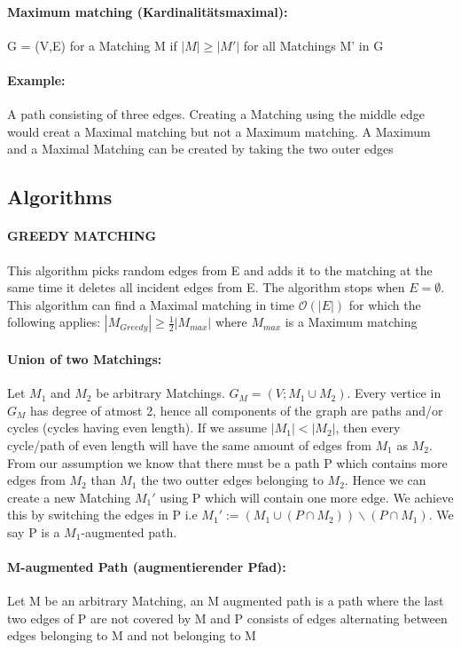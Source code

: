\documentclass[8pt]{extreport}
\begin{document}
\paragraph{Maximum matching (Kardinalitätsmaximal):} G = (V,E) for a Matching M if $|M|\geq |M'|$ for all Matchings M' in G
\paragraph{Example:} A path consisting of three edges. Creating a Matching using the middle edge would creat a Maximal matching but not a Maximum matching. A Maximum and a Maximal Matching can be created by taking the two outer edges
\subsection{Algorithms}
\paragraph{GREEDY MATCHING} This algorithm picks random edges from E and adds it to the matching at the same time it deletes all incident edges from E. The algorithm stops when $E=\emptyset$. This algorithm can find a Maximal matching in time $\mathcal{O}(|E|)$ for which the following applies: $|M_{Greedy}| \geq \frac{1}{2} |M_{max}|$ where $M_{max}$ is a Maximum matching
\paragraph{Union of two Matchings:} Let $M_{1}$ and $M_{2}$ be arbitrary Matchings. $G_{M} = (V;M_{1} \cup M_{2})$. Every vertice in $G_{M}$ has degree of atmost 2, hence all components of the graph are paths and/or cycles (cycles having even length). If we assume $|M_{1}| < |M_{2}|$, then every cycle/path of even length will have the same amount of edges from $M_{1}$ as $M_{2}$. From our assumption we know that there must be a path P which contains more edges from $M_{2}$ than $M_{1}$ the two outter edges belonging to $M_{2}$. Hence we can create a new Matching $M_{1}'$ using P which will contain one more edge. We achieve this by switching the edges in P i.e $M_{1}':= (M_{1} \cup (P \cap M_{2})) \backslash (P \cap M_{1})$. We say P is a $M_{1}$-augmented path.
\paragraph{M-augmented Path (augmentierender Pfad):} Let M be an arbitrary Matching, an M augmented path is a path where the last two edges of P are not covered by M and P consists of edges alternating between edges belonging to M and not belonging to M
\end{document}
